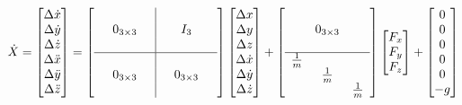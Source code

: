 \documentclass{article}
\begin{document}
\begin{equation}
	\dot{X} = \begin{bmatrix}
	\Delta \dot{x}\\
	\Delta \dot{y}\\
	\Delta \dot{z}\\
	\Delta \ddot{x}\\
	\Delta \ddot{y}\\
	\Delta \ddot{z}
	\end{bmatrix} = 
	\begin{bmatrix}
	\begin{array}{ccc|ccc}
	  &   &   &   &   &   \\
	  & 0_{3\times 3} &   &   & I_3 &   \\
	  &   &   &   &   &   \\\hline
	  &   &   &   &   &   \\
	  & 0_{3\times 3} &   &   & 0_{3\times 3} &   \\
	  &   &   &   &   &  
	\end{array}
	\end{bmatrix}
	\begin{bmatrix}
	\Delta x\\
	\Delta y\\
	\Delta z\\
	\Delta \dot{x}\\
	\Delta \dot{y}\\
	\Delta \dot{z}
	\end{bmatrix} + 
	\begin{bmatrix}
	\begin{array}{ccc}
	  &   &   \\
	  & 0_{3\times 3} &   \\
	  &   &   \\\hline
	\frac{1}{m} &   &   \\
	  & \frac{1}{m} &   \\
	  &   & \frac{1}{m}
	\end{array}
	\end{bmatrix}
	\begin{bmatrix}
	F_x\\
	F_y\\
	F_z\\
	\end{bmatrix} + 
	\begin{bmatrix}
	0\\
	0\\
	0\\
	0\\
	0\\
	-g
	\end{bmatrix}
\end{equation}
\end{document}
